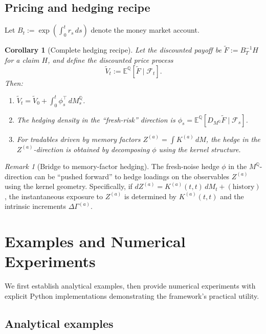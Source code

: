 \documentclass[11pt]{article}
\theoremstyle{plain}
\newtheorem{corollary}{Corollary}[section]
\theoremstyle{definition}
\theoremstyle{remark}
\newtheorem{remark}{Remark}[section]
\newcommand{\E}{\mathbb{E}}
\newcommand{\F}{\mathcal{F}}
\newcommand{\QQ}{\mathbb{Q}}
\newcommand{\dGamma}{\Delta\Gamma}
\begin{document}
\subsection{Pricing and hedging recipe}

Let $B_t := \exp(\int_0^t r_s\,ds)$ denote the money market account.

\begin{corollary}[Complete hedging recipe]\label{cor:hedging-recipe}
Let the discounted payoff be $\tilde{F} := B_T^{-1} H$ for a claim $H$, and define the
discounted price process
\[
\tilde{V}_t := \E^{\QQ}[\tilde{F} \mid \F_t].
\]
Then:
\begin{enumerate}[label=(\alph*)]
\item $\tilde{V}_t = \tilde{V}_0 + \int_0^t \phi_s^\top\,dM_s^{\QQ}$.
\item The hedging density in the ``fresh-risk'' direction is
$\phi_s = \E^{\QQ}[D_{M^{\QQ}} \tilde{F} \mid \F_s]$.
\item For tradables driven by memory factors $Z^{(a)} = \int K^{(a)}\,dM$,
the hedge in the $Z^{(a)}$-direction is obtained by decomposing $\phi$
using the kernel structure.
\end{enumerate}
\end{corollary}

\begin{remark}[Bridge to memory-factor hedging]
The fresh-noise hedge $\phi$ in the $M^{\QQ}$-direction can be ``pushed forward''
to hedge loadings on the observables $Z^{(a)}$ using the kernel geometry.
Specifically, if $dZ^{(a)} = K^{(a)}(t,t)\,dM_t + (\text{history})$, the
instantaneous exposure to $Z^{(a)}$ is determined by $K^{(a)}(t,t)$ and
the intrinsic increments $\dGamma^{(a)}$.
\end{remark}

\section{Examples and Numerical Experiments}\label{sec:examples}

We first establish analytical examples, then provide numerical experiments
with explicit Python implementations demonstrating the framework's practical
utility.

\subsection{Analytical examples}
\end{document}
